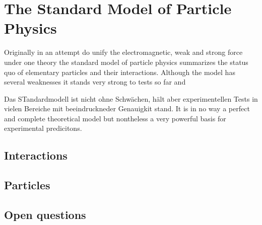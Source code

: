 \section{The Standard Model of Particle Physics}

Originally in an attempt do unify the electromagnetic, weak and strong force under one theory the standard model of particle physics summarizes the status quo of elementary particles and their interactions. Although the model has several weaknesses it stands very strong to tests so far and 

Das STandardmodell ist nicht ohne Schwächen, hält aber experimentellen Tests in vielen Bereiche mit beeindruckneder Genauigkit stand. It is in no way a perfect and complete theoretical model but nontheless a very powerful basis for experimental predicitons.

\subsection{Interactions}

\subsection{Particles}

\subsection{Open questions}